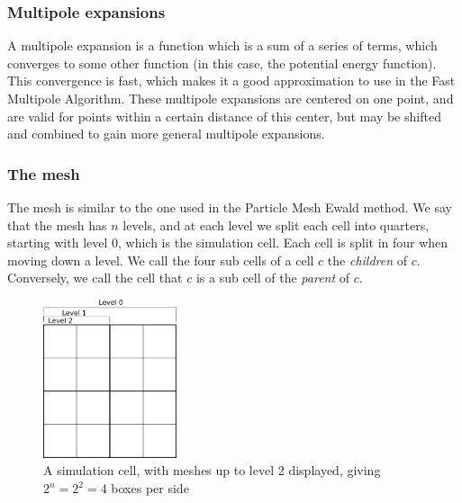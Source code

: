 \documentclass[pdftex,twoside,a4paper]{report}
\newcommand{\bcen}{\begin{center}}
\newcommand{\ecen}{\end{center}}
\newcommand{\pmem}{Particle Mesh Ewald method}
\newcommand{\fma}{Fast Multipole Algorithm}
\begin{document}
\subsubsection{Multipole expansions}
A multipole expansion is a function which is a sum of a series of terms, which converges to some other function (in this case, the potential energy function). This convergence is fast, which makes it a good approximation to use in the \fma{}. These multipole expansions are centered on one point, and are valid for points within a certain distance of this center, but may be shifted and combined to gain more general multipole expansions. \cite{greengard:315}

\subsubsection{The mesh}
The mesh is similar to the one used in the \pmem{}. We say that the mesh has $n$ levels, and at each level we split each cell into quarters, starting with level $0$, which is the simulation cell. Each cell is split in four when moving down a level. We call the four sub cells of a cell $c$ the \emph{children} of $c$. Conversely, we call the cell that $c$ is a sub cell of the \emph{parent} of $c$.
\begin{figure}[H]
\bcen \includegraphics[width=0.35\textwidth]{figures/fma_mesh.pdf} \ecen
\caption{A simulation cell, with meshes up to level 2 displayed, giving $2^n = 2^2 = 4$ boxes per side}
\end{figure}
\end{document}
